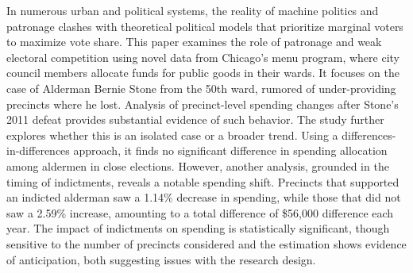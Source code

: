 \begin{spacing}{1.0}
    In numerous urban and political systems, the reality of machine politics and patronage clashes with theoretical political models that prioritize marginal voters to maximize vote share.
    This paper examines the role of patronage and weak electoral competition using novel data from Chicago's menu program, where city council members allocate funds for public goods in their wards.
    It focuses on the case of Alderman Bernie Stone from the 50th ward, rumored of under-providing precincts where he lost. Analysis of precinct-level spending changes after Stone's 2011 defeat provides substantial evidence of such behavior. 
    The study further explores whether this is an isolated case or a broader trend. 
    Using a differences-in-differences approach, it finds no significant difference in spending allocation among aldermen in close elections. 
    However, another analysis, grounded in the timing of indictments, reveals a notable spending shift. 
    Precincts that supported an indicted alderman saw a 1.14\% decrease in spending, while those that did not saw a 2.59\% increase, amounting to a total difference of \$56,000 difference each year. 
    The impact of indictments on spending is statistically significant, though sensitive to the number of precincts considered and the estimation shows evidence of anticipation, both suggesting issues with the research design.
\end{spacing}
